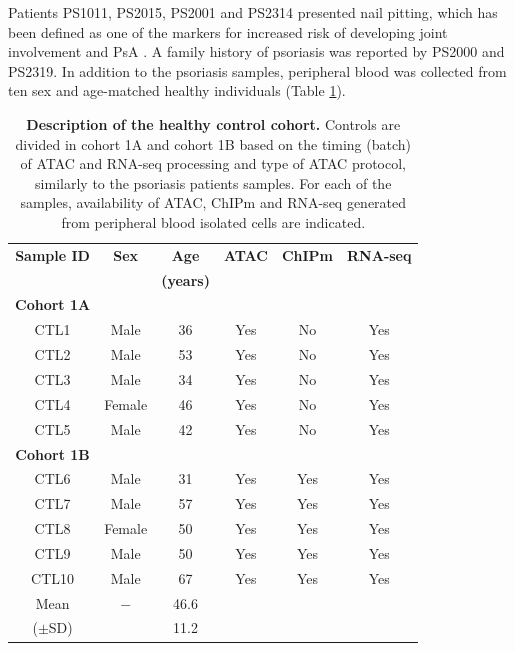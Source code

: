 \noindent Patients PS1011, PS2015, PS2001 and PS2314 presented nail pitting, which has been defined as one of the markers for increased risk of developing joint involvement and PsA \parencite{Moll1973,Griffiths2007,McGonagle2011}. A family history of psoriasis was reported by PS2000 and PS2319. In addition to the psoriasis samples, peripheral blood was collected from ten sex and age-matched healthy individuals (Table \ref{tab:Control_cohort_metadata}).



\begin{table}[ht]
\renewcommand{\arraystretch}{0.8}
\centering
\begin{tabular}{@{} c c c c c c}
\toprule
\textbf{Sample ID} & \textbf{Sex} & \textbf{Age}    & \textbf{ATAC} & \textbf{ChIPm} & \textbf{RNA-seq}\\
                   &             & \textbf{(years)} &               &                &                  \\
\midrule
\midrule
\textbf{Cohort 1A} & & & & & \\
\midrule
CTL1 & Male   & 36 & Yes& No& Yes\\
CTL2 & Male   & 53 & Yes& No& Yes\\
CTL3 & Male   & 34 & Yes& No& Yes\\
CTL4 & Female & 46 & Yes& No& Yes\\
CTL5 & Male   & 42 & Yes& No& Yes\\
\midrule
\midrule
\textbf{Cohort 1B} & & & & & \\
\midrule
CTL6  & Male   & 31 & Yes& Yes& Yes\\
CTL7  & Male   & 57 & Yes& Yes& Yes\\
CTL8  & Female & 50 & Yes& Yes& Yes\\
CTL9  & Male   & 50 & Yes& Yes& Yes\\
CTL10 & Male   & 67 & Yes& Yes& Yes\\
\midrule
Mean      & $-$ & 46.6 & & & \\ 
($\pm$SD) &     & 11.2 & & & \\
\bottomrule
\end{tabular}
\medskip %
\caption[Description of the healthy control cohort.]{\textbf{Description of the healthy control cohort.} Controls are divided in cohort 1A and cohort 1B based on the timing (batch) of ATAC and RNA-seq processing and type of ATAC protocol, similarly to the psoriasis patients samples. For each of the samples, availability of ATAC, ChIPm and RNA-seq generated from peripheral blood isolated cells are indicated.}
\label{tab:Control_cohort_metadata}
\end{table}
\bigskip %


